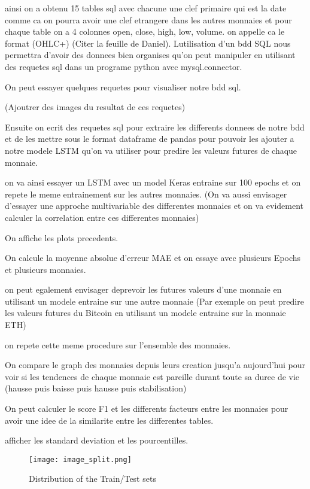 \documentclass[10pt]{article}
\begin{document}
\begin{multicols}{2}
ainsi on a obtenu 15 tables sql avec chacune une clef primaire qui est la date comme ca on pourra avoir une clef etrangere dans les autres monnaies et pour chaque table on a 4 colonnes open, close, high, low, volume.
on appelle ca le format (OHLC+) (Citer la feuille de Daniel).
Lutilisation d'un bdd SQL nous permettra d'avoir des donnees bien organises qu'on peut manipuler en utilisant des requetes sql dans un programe python avec mysql.connector.

On peut essayer quelques requetes pour visualiser notre bdd sql.

(Ajoutrer des images du resultat de ces requetes)

Ensuite on ecrit des requetes sql pour extraire les differents donnees de notre bdd et de les mettre sous le format dataframe de pandas pour pouvoir les ajouter a notre modele LSTM qu'on va utiliser pour predire les valeurs futures de chaque monnaie.

on va ainsi essayer un LSTM avec un model Keras entraine sur 100 epochs et on repete le meme entrainement sur les autres monnaies.
(On va aussi envisager d'essayer une approche multivariable des differentes monnaies et on va evidement calculer la correlation entre ces differentes monnaies)

On affiche les plots precedents.

On calcule la moyenne absolue d'erreur MAE et on essaye avec plusieurs Epochs et plusieurs monnaies.

on peut egalement envisager deprevoir les futures valeurs d'une monnaie en utilisant un modele entraine sur une autre monnaie (Par exemple on peut predire les valeurs futures du Bitcoin en utilisant un modele entraine sur la monnaie ETH)

on repete cette meme procedure sur l'ensemble des monnaies.

On compare le graph des monnaies depuis leurs creation jusqu'a aujourd'hui pour voir si les tendences de chaque monnaie est pareille durant toute sa duree de vie (hausse puis baisse puis hausse puis stabilisation)

On peut calculer le score F1 et les differents facteurs entre les monnaies pour avoir une idee de la similarite entre les differentes tables.

afficher les standard deviation et les pourcentilles.


\begin{figure}[H]
\centering
\texttt{[image: image\_split.png]}
\caption{Distribution of the Train/Test sets}
\label{f2}
\end{figure}



\end{multicols}
\end{document}
